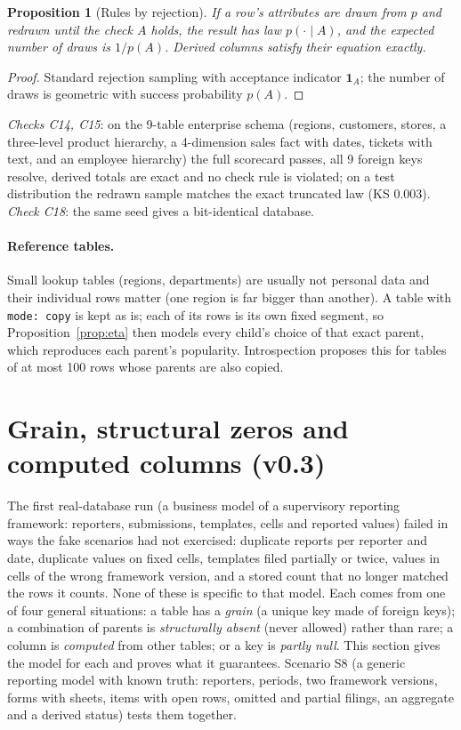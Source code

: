 \documentclass[11pt,a4paper]{article}
\newtheorem{proposition}{Proposition}
\theoremstyle{definition}
\theoremstyle{remark}
\begin{document}
\begin{proposition}[Rules by rejection]\label{prop:rules}
If a row's attributes are drawn from $p$ and redrawn until the check $A$ holds, the result has law $p(\cdot\mid A)$, and the expected number of draws is $1/p(A)$. Derived columns satisfy their equation exactly.
\end{proposition}
\begin{proof}
Standard rejection sampling with acceptance indicator $\mathbf 1_A$; the number of draws is geometric with success probability $p(A)$.
\end{proof}
\noindent\emph{Checks C14, C15}: on the 9-table enterprise schema (regions, customers, stores, a three-level product hierarchy, a 4-dimension sales fact with dates, tickets with text, and an employee hierarchy) the full scorecard passes, all 9 foreign keys resolve, derived totals are exact and no check rule is violated; on a test distribution the redrawn sample matches the exact truncated law (KS 0.003). \emph{Check C18}: the same seed gives a bit-identical database.

\paragraph{Reference tables.} Small lookup tables (regions, departments) are usually not personal data and their individual rows matter (one region is far bigger than another). A table with \texttt{mode: copy} is kept as is; each of its rows is its own fixed segment, so Proposition~\ref{prop:eta} then models every child's choice of that exact parent, which reproduces each parent's popularity. Introspection proposes this for tables of at most 100 rows whose parents are also copied.

\section{Grain, structural zeros and computed columns (v0.3)}\label{sec:v03}
The first real-database run (a business model of a supervisory reporting framework: reporters, submissions, templates, cells and reported values) failed in ways the fake scenarios had not exercised: duplicate reports per reporter and date, duplicate values on fixed cells, templates filed partially or twice, values in cells of the wrong framework version, and a stored count that no longer matched the rows it counts. None of these is specific to that model. Each comes from one of four general situations: a table has a \emph{grain} (a unique key made of foreign keys); a combination of parents is \emph{structurally absent} (never allowed) rather than rare; a column is \emph{computed} from other tables; or a key is \emph{partly null}. This section gives the model for each and proves what it guarantees. Scenario S8 (a generic reporting model with known truth: reporters, periods, two framework versions, forms with sheets, items with open rows, omitted and partial filings, an aggregate and a derived status) tests them together.
\end{document}
